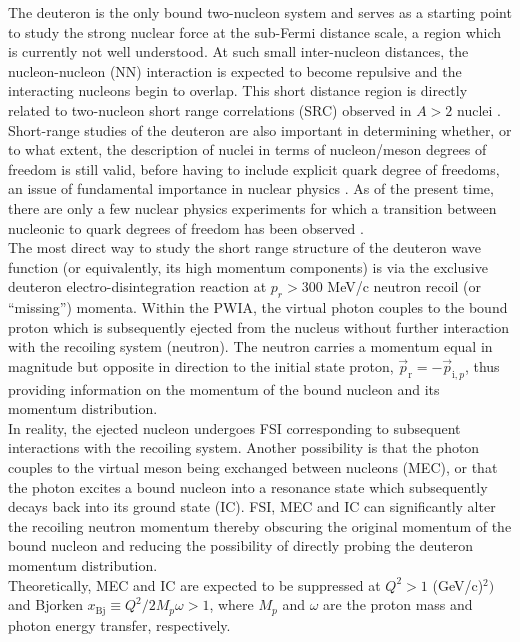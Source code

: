 The deuteron is the only bound two-nucleon  system and serves as a starting point to study the strong nuclear force at the sub-Fermi distance scale, a region which is currently
not well understood. At such small inter-nucleon distances, the nucleon-nucleon (NN) interaction is expected to become repulsive and the interacting
nucleons begin to overlap. This short distance region is directly related to two-nucleon short range correlations (SRC) observed in $A>2$ nuclei \cite{PhysRevC.68.014313,PhysRevLett.96.082501,PhysRevLett.99.072501,Fomin_2017,Barack_2019,RevModPhys.89.045002}.
Short-range studies of the deuteron are also important in determining whether, or to what extent, the description of nuclei in terms of nucleon/meson degrees of freedom is still valid, before
having to include explicit quark degree of freedoms, an issue of fundamental importance in nuclear physics \cite{sargsian_2015}. As of the present time, there are only a few nuclear physics experiments for
which a transition between nucleonic to quark degrees of freedom has been observed \cite{PhysRevLett.81.4576,PhysRevLett.87.102302,PhysRevC.66.042201}. \\
\indent The most direct way to study the short range structure of the deuteron wave function (or equivalently, its high momentum components) is via the exclusive deuteron
electro-disintegration reaction at $p_{r}>300$ MeV/c neutron recoil (or ``missing'') momenta. Within the PWIA, the virtual photon couples to
the bound proton which is subsequently ejected from the nucleus without further interaction with the recoiling system (neutron). The neutron carries a momentum equal in magnitude but opposite in direction
to the initial state proton, $\vec{p}_{\mathrm{r}} = -\vec{p}_{\mathrm{i},p}$, thus providing information on the momentum of the bound nucleon and its momentum distribution. \\
\indent In reality, the ejected nucleon undergoes FSI corresponding to subsequent interactions with the recoiling system. Another possibility is that the
photon couples to the virtual meson being exchanged between nucleons (MEC), or that the photon excites a bound nucleon into a resonance state which subsequently
decays back into its ground state (IC).  FSI, MEC and IC can significantly alter the recoiling neutron
momentum thereby obscuring the original momentum of the bound nucleon and reducing the possibility of directly probing the deuteron momentum distribution. \\
\indent Theoretically, MEC and IC are expected to be suppressed at $Q^{2}>1$ (GeV/c)$^{2})$ and Bjorken $x_{\mathrm{Bj}}\equiv Q^{2}/2M_{p}\omega>1$, where $M_{p}$ and $\omega$ are the proton mass and photon energy transfer, respectively.
